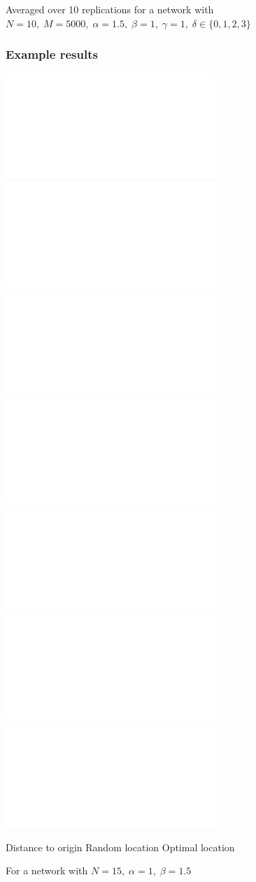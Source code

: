 \documentclass[11pt]{beamer}
\begin{document}
\begin{frame}
\begin{center}
%

\vspace*{-.2cm}

%
%
%
%

\vspace*{.2cm}

Averaged over 10 replications for a network with $N = 10, \; M = 5000, \; \alpha = 1.5, \; \beta = 1, \; \gamma = 1, \; \delta \in \{0,1,2,3\}$
\end{center}
\end{frame}

\begin{frame}
\frametitle{Example results}
\centering
{}%
%
%

\includegraphics<1->[width=.3\textwidth]{../plots/distance-1_0-1_5-1-1.pdf}
\includegraphics<1>[width=.3\textwidth]{../plots/individual-1_0-1_5-1-1.pdf}
\includegraphics<2>[width=.3\textwidth]{../plots/individual-1_0-1_5-10-1.pdf}
\includegraphics<3>[width=.3\textwidth]{../plots/individual-1_0-1_5-100-1.pdf}
\includegraphics<1>[width=.3\textwidth]{../plots/optimal-1_0-1_5-1-1.pdf}
\includegraphics<2>[width=.3\textwidth]{../plots/optimal-1_0-1_5-10-1.pdf}
\includegraphics<3>[width=.3\textwidth]{../plots/optimal-1_0-1_5-100-1.pdf}

Distance to origin \hspace*{.6cm} Random location \hspace*{.6cm} Optimal location

\vspace*{.5cm}

For a network with $N = 15, \; \alpha = 1, \; \beta = 1.5$
\end{frame}
\end{document}
